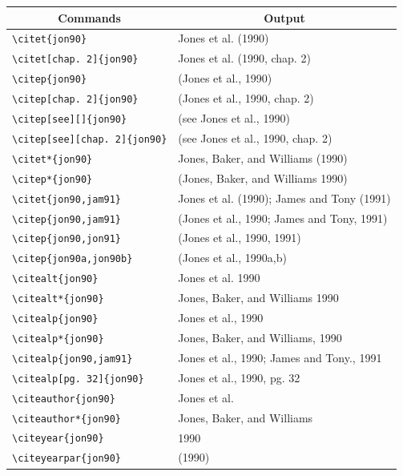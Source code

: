 \begin{longtable}{|l|l|}\hline
	\multicolumn{1}{|c|}{\textbf{Commands}} & \multicolumn{1}{c|}{\textbf{Output}}\\\hline
	\verb|\citet{jon90}| 						& Jones et al. (1990)\\\hline
	\verb|\citet[chap. 2]{jon90}|			& Jones et al. (1990, chap. 2)\\\hline
	\verb|\citep{jon90}|						& (Jones et al., 1990)\\\hline
	\verb|\citep[chap. 2]{jon90}|			& (Jones et al., 1990, chap. 2)\\\hline
	\verb|\citep[see][]{jon90}|			 	& (see Jones et al., 1990)\\\hline
	\verb|\citep[see][chap. 2]{jon90}|	  & (see Jones et al., 1990, chap. 2)\\\hline
	\verb|\citet*{jon90}| 						& Jones, Baker, and Williams (1990)\\\hline
	\verb|\citep*{jon90}|						& (Jones, Baker, and Williams 1990)\\\hline
	\verb|\citet{jon90,jam91}|				 & Jones et al. (1990); James and Tony (1991)\\\hline
	\verb|\citep{jon90,jam91}|				& (Jones et al., 1990; James and Tony, 1991)\\\hline
	\verb|\citep{jon90,jon91}| 				& (Jones et al., 1990, 1991)\\\hline
	\verb|\citep{jon90a,jon90b}|			& (Jones et al., 1990a,b)\\\hline
	\verb|\citealt{jon90}|						& Jones et al. 1990\\\hline
	\verb|\citealt*{jon90}| 					& Jones, Baker, and Williams 1990\\\hline
	\verb|\citealp{jon90}| 						& Jones et al., 1990\\\hline
	\verb|\citealp*{jon90}| 					& Jones, Baker, and Williams, 1990\\\hline
	\verb|\citealp{jon90,jam91}| 			& Jones et al., 1990; James and Tony., 1991\\\hline
	\verb|\citealp[pg. 32]{jon90}| 			& Jones et al., 1990, pg. 32\\\hline
	\verb|\citeauthor{jon90}|  				& Jones et al.\\\hline
	\verb|\citeauthor*{jon90}| 				& Jones, Baker, and Williams\\\hline
	\verb|\citeyear{jon90}| 					& 1990\\\hline
	\verb|\citeyearpar{jon90}| 				& (1990)\\\hline
\end{longtable}





